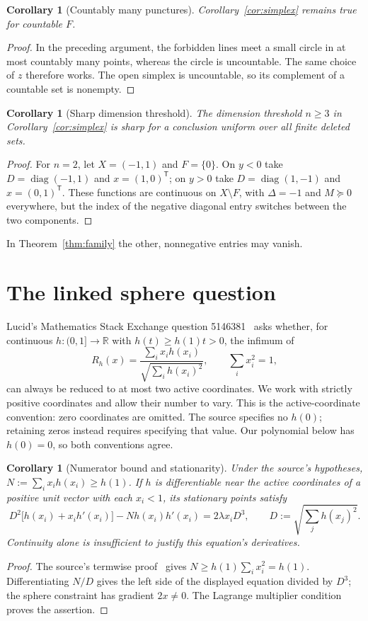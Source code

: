 \documentclass[11pt]{article}
\newtheorem{corollary}[theorem]{Corollary}
\newcommand{\R}{\mathbb R}
\newcommand{\diag}{\operatorname{diag}}
\begin{document}
\begin{corollary}[Countably many punctures]\label{cor:countable}
Corollary~\ref{cor:simplex} remains true for countable $F$.
\end{corollary}
\begin{proof}
In the preceding argument, the forbidden lines meet a small circle
in at most countably many points, whereas the circle is uncountable.
The same choice of $z$ therefore works. The open simplex is uncountable,
so its complement of a countable set is nonempty.
\end{proof}

\begin{corollary}[Sharp dimension threshold]\label{cor:sharp}
The dimension threshold $n\ge3$ in Corollary~\ref{cor:simplex} is sharp
for a conclusion uniform over all finite deleted sets.
\end{corollary}
\begin{proof}
For $n=2$, let $X=(-1,1)$ and $F=\{0\}$.
On $y<0$ take $D=\diag(-1,1)$ and $x=(1,0)^{\mathsf T}$;
on $y>0$ take $D=\diag(1,-1)$ and $x=(0,1)^{\mathsf T}$.
These functions are continuous on $X\setminus F$, with $\Delta=-1$ and
$M\succeq0$ everywhere, but the index of the negative diagonal entry switches
between the two components.
\end{proof}
In Theorem~\ref{thm:family} the other, nonnegative entries may vanish.

\section{The linked sphere question}
Lucid's Mathematics Stack Exchange question 5146381~\cite{otherquestion}
asks whether, for continuous $h:(0,1]\to\R$ with $h(t)\ge h(1)t>0$,
the infimum of
\[
R_h(x)=\frac{\sum_i x_i h(x_i)}{\sqrt{\sum_i h(x_i)^2}},
\qquad \sum_i x_i^2=1,
\]
can always be reduced to at most two active coordinates.
We work with strictly positive coordinates and allow their number to vary.
This is the active-coordinate convention: zero coordinates are omitted.
The source specifies no $h(0)$; retaining zeros instead requires specifying
that value. Our polynomial below has $h(0)=0$, so both conventions agree.
\begin{corollary}[Numerator bound and stationarity]\label{cor:stationarity}
Under the source's hypotheses, $N:=\sum_i x_i h(x_i)\ge h(1)$.
If $h$ is differentiable near the active coordinates of a positive unit
vector with each $x_i<1$, its stationary points satisfy
\[
D^2\bigl[h(x_i)+x_i h'(x_i)\bigr]-N h(x_i)h'(x_i)
=2\lambda x_i D^3,\qquad D:=\sqrt{\sum_j h(x_j)^2}.
\]
Continuity alone is insufficient to justify this equation's derivatives.
\end{corollary}
\begin{proof}
The source's termwise proof~\cite{otherquestion} gives
$N\ge h(1)\sum_i x_i^2=h(1)$.
Differentiating $N/D$ gives the left side of the displayed equation
divided by $D^3$; the sphere constraint has gradient $2x\ne0$.
The Lagrange multiplier condition proves the assertion.
\end{proof}
\end{document}
